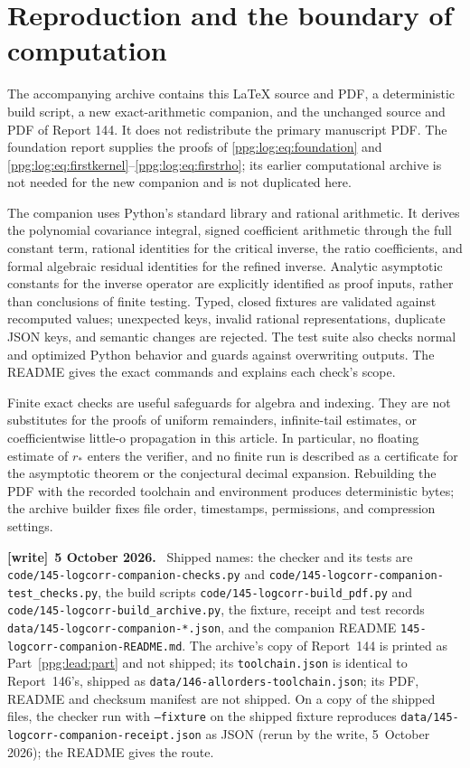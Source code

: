 \documentclass[11pt,letterpaper]{article}
\theoremstyle{remark}\newtheorem{remark}[theorem]{Remark}
\numberwithin{equation}{section}
\newcommand{\file}[1]{\nolinkurl{#1}}
\newenvironment{writenote}[1][]{\par\smallskip\begingroup\small
 \noindent\textbf{[write]}\if\relax\detokenize{#1}\relax\else~\textbf{#1.}\fi\ }%
 {\par\endgroup\smallskip}
\begin{document}
\section{Reproduction and the boundary of computation}\label{ppg:log:sec:reproduction}
The accompanying archive contains this LaTeX source and PDF, a deterministic build script, a new exact-arithmetic companion, and the unchanged source and PDF of Report 144. It does not redistribute the primary manuscript PDF. The foundation report supplies the proofs of \eqref{ppg:log:eq:foundation} and \eqref{ppg:log:eq:firstkernel}--\eqref{ppg:log:eq:firstrho}; its earlier computational archive is not needed for the new companion and is not duplicated here.

The companion uses Python's standard library and rational arithmetic. It derives the polynomial covariance integral, signed coefficient arithmetic through the full constant term, rational identities for the critical inverse, the ratio coefficients, and formal algebraic residual identities for the refined inverse. Analytic asymptotic constants for the inverse operator are explicitly identified as proof inputs, rather than conclusions of finite testing. Typed, closed fixtures are validated against recomputed values; unexpected keys, invalid rational representations, duplicate JSON keys, and semantic changes are rejected. The test suite also checks normal and optimized Python behavior and guards against overwriting outputs. The README gives the exact commands and explains each check's scope.

Finite exact checks are useful safeguards for algebra and indexing. They are not substitutes for the proofs of uniform remainders, infinite-tail estimates, or coefficientwise little-o propagation in this article. In particular, no floating estimate of $r_*$ enters the verifier, and no finite run is described as a certificate for the asymptotic theorem or the conjectural decimal expansion. Rebuilding the PDF with the recorded toolchain and environment produces deterministic bytes; the archive builder fixes file order, timestamps, permissions, and compression settings.
\begin{writenote}[5 October 2026]
Shipped names: the checker and its tests are \file{code/145-logcorr-companion-checks.py} and \file{code/145-logcorr-companion-test_checks.py}, the build scripts \file{code/145-logcorr-build_pdf.py} and \file{code/145-logcorr-build_archive.py}, the fixture, receipt and test records \file{data/145-logcorr-companion-*.json}, and the companion README \file{145-logcorr-companion-README.md}. The archive's copy of Report~144 is printed as Part~\ref{ppg:lead:part} and not shipped; its \file{toolchain.json} is identical to Report~146's, shipped as \file{data/146-allorders-toolchain.json}; its PDF, README and checksum manifest are not shipped. On a copy of the shipped files, the checker run with \texttt{--fixture} on the shipped fixture reproduces \file{data/145-logcorr-companion-receipt.json} as JSON (rerun by the write, 5~October 2026); the README gives the route.
\end{writenote}
\end{document}
